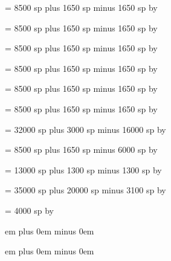 \newskip\spaceaftersmallbar
\spaceaftersmallbar = 8500 sp plus 1650 sp minus 1650 sp
\multiply\spaceaftersmallbar by \factor

\newskip\spacebeforeminor
\spacebeforeminor = 8500 sp plus 1650 sp minus 1650 sp
\multiply\spacebeforeminor by \factor

\newskip\spaceafterminor
\spaceafterminor = 8500 sp plus 1650 sp minus 1650 sp
\multiply\spaceafterminor by \factor

\newskip\spacebeforemaior
\spacebeforemaior = 8500 sp plus 1650 sp minus 1650 sp
\multiply\spacebeforemaior by \factor

\newskip\spaceaftermaior
\spaceaftermaior = 8500 sp plus 1650 sp minus 1650 sp
\multiply\spaceaftermaior by \factor

\newskip\spacebeforefinalis
\spacebeforefinalis = 8500 sp plus 1650 sp minus 1650 sp
\multiply\spacebeforefinalis by \factor

\newskip\spacebeforefinalfinalis
\spacebeforefinalfinalis= 32000 sp plus 3000 sp minus 16000 sp
\multiply\spacebeforefinalfinalis by \factor

\newskip\spaceafterfinalis
\spaceafterfinalis = 8500 sp plus 1650 sp minus 6000 sp
\multiply\spaceafterfinalis by \factor

\newskip\textbartextspace
\textbartextspace = 13000 sp plus 1300 sp minus 1300 sp
\multiply\textbartextspace by \factor

\newskip\notebarspace
\notebarspace = 35000 sp plus 20000 sp minus 3100 sp
\multiply\notebarspace by \factor

\newdimen\maximumspacewithoutdash
\maximumspacewithoutdash = 4000 sp
\multiply\maximumspacewithoutdash by \factor

\newskip\afterinitialshift
{} em plus 0em minus 0em

\newskip\beforeinitialshift
{} em plus 0em minus 0em

\def\setspaceafterinitial#1{%
\afterinitialshift=#1 %
\relax %
}

\def\setspacebeforeinitial#1{%
\beforeinitialshift=#1 %
\relax %
}

\newskip\clefchangespace

